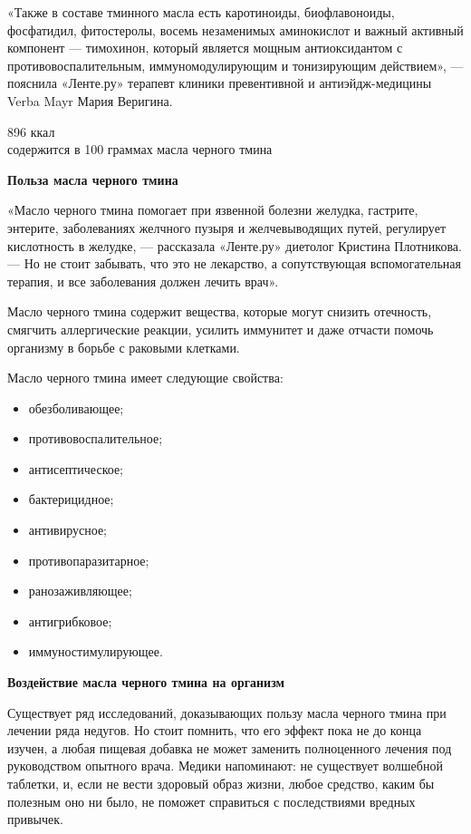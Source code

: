 «Также в составе тминного масла есть каротиноиды, биофлавоноиды, фосфатидил, фитостеролы, восемь незаменимых аминокислот и важный активный компонент — тимохинон, который является мощным антиоксидантом с противовоспалительным, иммуномодулирующим и тонизирующим действием», — пояснила «Ленте.ру» терапевт клиники превентивной и антиэйдж-медицины Verba Mayr Мария Веригина.

\begin{fancyquotes}
    {\Huge 896 ккал}\\

    содержится в 100 граммах масла черного тмина
\end{fancyquotes}


\textbf{Польза масла черного тмина}

«Масло черного тмина помогает при язвенной болезни желудка, гастрите, энтерите, заболеваниях желчного пузыря и желчевыводящих путей, регулирует кислотность в желудке, — рассказала «Ленте.ру» диетолог Кристина Плотникова. — Но не стоит забывать, что это не лекарство, а сопутствующая вспомогательная терапия, и все заболевания должен лечить врач».

Масло черного тмина содержит вещества, которые могут снизить отечность, смягчить аллергические реакции, усилить иммунитет и даже отчасти помочь организму в борьбе с раковыми клетками.

Масло черного тмина имеет следующие свойства:

\begin{itemize}
    \item обезболивающее;
    \item противовоспалительное;
    \item антисептическое;
    \item бактерицидное;
    \item антивирусное;
    \item противопаразитарное;
    \item ранозаживляющее;
    \item антигрибковое;
    \item иммуностимулирующее.
\end{itemize}

\textbf{Воздействие масла черного тмина на организм}

Существует ряд исследований, доказывающих пользу масла черного тмина при лечении ряда недугов. Но стоит помнить, что его эффект пока не до конца изучен, а любая пищевая добавка не может заменить полноценного лечения под руководством опытного врача. Медики напоминают: не существует волшебной таблетки, и, если не вести здоровый образ жизни, любое средство, каким бы полезным оно ни было, не поможет справиться с последствиями вредных привычек.

